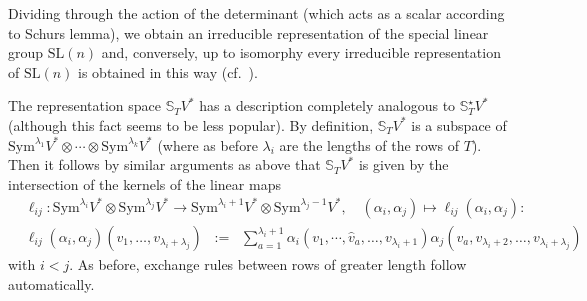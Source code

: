 \documentclass[11pt,a4paper]{article}
\theoremstyle{plain}
\theoremstyle{remark}
\newcommand{\Sym}{\mathrm{Sym}}
\newcommand{\SL}{\mathrm{SL}}
\newcommand{\bbS}{\mathbb{S}}
\begin{document}
Dividing through the action of the determinant (which acts as a scalar
according to Schurs lemma), we obtain an irreducible representation of the special linear
group $\SL(n)$ and, conversely, up to isomorphy  every irreducible representation of $\SL(n)$ is obtained in this way (cf.~\cite[Ch.~15]{FH}). %




The representation space $\bbS_TV^*$ has a description completely analogous to  $\bbS^\star_TV^*$ (although this fact seems to be less popular).
By definition, $\bbS_TV^*$ is a subspace of $\Sym^{\lambda_1}V^*\otimes\cdots \otimes \Sym^{\lambda_k}V^*$ (where as before $\lambda_i$ are the lengths of the rows of $T$).
Then it follows by similar arguments as above that $\bbS_TV^*$ is given by the
intersection of the kernels of the linear maps
\begin{align}
& \ell_{ij} \colon \Sym^{\lambda_i}V^*\otimes \Sym^{\lambda_j}V^*\to \Sym^{\lambda_i+1}V^*\otimes
\Sym^{\lambda_j-1}V^*,\quad (\alpha_i,\alpha_j)\mapsto \ell_{ij}(\alpha_i,\alpha_j):\\
&\ell_{ij}(\alpha_i,\alpha_j)(v_1,\ldots,v_{\lambda_i+\lambda_j})\;\;:=\;\;
\sum_{a=1}^{\lambda_i+1}\alpha_i(v_1,\cdots,\hat v_a,\ldots,v_{\lambda_i+1})\alpha_j(v_a,v_{\lambda_i+2},\ldots,v_{\lambda_i+\lambda_j})
\end{align}
with $i< j$. %
As before, exchange rules between rows of greater length follow automatically. 
\end{document}
